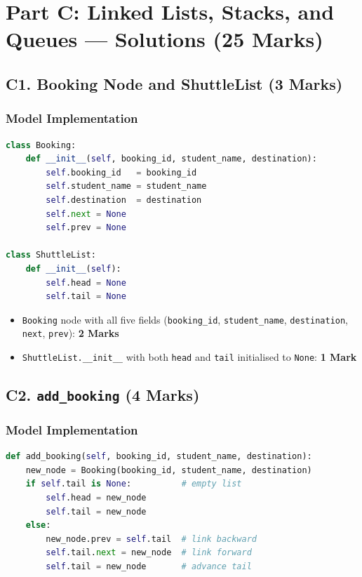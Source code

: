 \documentclass[11pt,a4paper]{article}
\newenvironment{markbox}[1]{%
    \begin{tcolorbox}[colback=markgreen!6!white, colframe=markgreen, title=\textbf{Mark Allocation --- #1}]
}{%
    \end{tcolorbox}
}
\begin{document}
\newpage

\section{Part C: Linked Lists, Stacks, and Queues --- Solutions (25 Marks)}

\subsection*{C1. Booking Node and ShuttleList (3 Marks)}

\subsubsection*{Model Implementation}
\begin{lstlisting}[language=Python]
class Booking:
    def __init__(self, booking_id, student_name, destination):
        self.booking_id   = booking_id
        self.student_name = student_name
        self.destination  = destination
        self.next = None
        self.prev = None

class ShuttleList:
    def __init__(self):
        self.head = None
        self.tail = None
\end{lstlisting}

\begin{markbox}{C1 --- 3 Marks}
\begin{itemize}
    \item \texttt{Booking} node with all five fields (\texttt{booking\_id}, \texttt{student\_name}, \texttt{destination}, \texttt{next}, \texttt{prev}): \textbf{2 Marks}
    \item \texttt{ShuttleList.\_\_init\_\_} with both \texttt{head} and \texttt{tail} initialised to \texttt{None}: \textbf{1 Mark}
\end{itemize}
\end{markbox}

\subsection*{C2. \texttt{add\_booking} (4 Marks)}

\subsubsection*{Model Implementation}
\begin{lstlisting}[language=Python]
def add_booking(self, booking_id, student_name, destination):
    new_node = Booking(booking_id, student_name, destination)
    if self.tail is None:          # empty list
        self.head = new_node
        self.tail = new_node
    else:
        new_node.prev = self.tail  # link backward
        self.tail.next = new_node  # link forward
        self.tail = new_node       # advance tail
\end{lstlisting}
\end{document}
